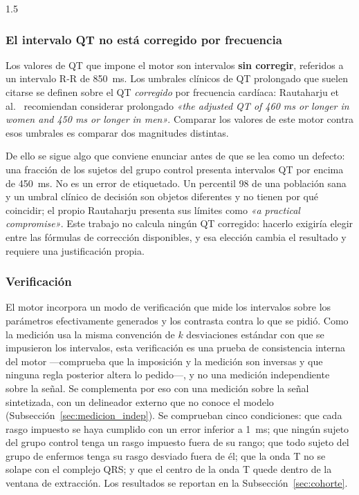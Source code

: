 \begin{spacing}{1.5}
\subsubsection{El intervalo QT no está corregido por frecuencia}

Los valores de QT que impone el motor son intervalos \textbf{sin corregir}, referidos a un intervalo R-R de 850~ms. Los umbrales clínicos de QT prolongado que suelen citarse se definen sobre el QT \emph{corregido} por frecuencia cardíaca: Rautaharju et al.\ \cite{rautaharju2009aha} recomiendan considerar prolongado \emph{«the adjusted QT of 460 ms or longer in women and 450 ms or longer in men»}. Comparar los valores de este motor contra esos umbrales es comparar dos magnitudes distintas.

De ello se sigue algo que conviene enunciar antes de que se lea como un defecto: una fracción de los sujetos del grupo control presenta intervalos QT por encima de 450~ms. No es un error de etiquetado. Un percentil 98 de una población sana y un umbral clínico de decisión son objetos diferentes y no tienen por qué coincidir; el propio Rautaharju presenta sus límites como \emph{«a practical compromise»}. Este trabajo no calcula ningún QT corregido: hacerlo exigiría elegir entre las fórmulas de corrección disponibles, y esa elección cambia el resultado y requiere una justificación propia.

\subsubsection{Verificación}

El motor incorpora un modo de verificación que mide los intervalos sobre los parámetros efectivamente generados y los contrasta contra lo que se pidió. Como la medición usa la misma convención de $k$ desviaciones estándar con que se impusieron los intervalos, esta verificación es una prueba de consistencia interna del motor ---comprueba que la imposición y la medición son inversas y que ninguna regla posterior altera lo pedido---, y no una medición independiente sobre la señal. Se complementa por eso con una medición sobre la señal sintetizada, con un delineador externo que no conoce el modelo (Subsección~\ref{sec:medicion_indep}). Se comprueban cinco condiciones: que cada rasgo impuesto se haya cumplido con un error inferior a 1~ms; que ningún sujeto del grupo control tenga un rasgo impuesto fuera de su rango; que todo sujeto del grupo de enfermos tenga su rasgo desviado fuera de él; que la onda T no se solape con el complejo QRS; y que el centro de la onda T quede dentro de la ventana de extracción. Los resultados se reportan en la Subsección~\ref{sec:cohorte}.


\end{spacing}
